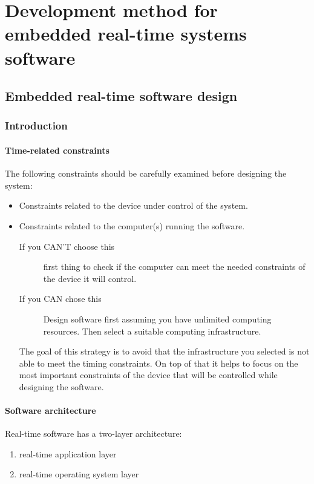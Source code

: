 \documentclass[../main.tex]{subfiles}
\begin{document}
\chapter{Development method for embedded real-time systems software}

\section{Embedded real-time software design}
\subsection{Introduction}

\subsubsection{Time-related constraints}
The following constraints should be carefully examined before designing the system: 
\begin{itemize}
	\item Constraints related to the device under control of the system. 
	\item Constraints related to the computer(s) running the software. 
		\begin{description}
			\item[If you CAN'T choose this] first thing to check if the computer can meet the needed constraints of the device it will control.
				\item[If you CAN  chose this] Design software first assuming you have unlimited computing resources. Then select a suitable computing infrastructure.
		\end{description} 
	The goal of this strategy is to avoid that the infrastructure you selected is not able to meet the timing constraints. On top of that it helps to focus on the most important constraints of the device that will be controlled while designing the software.
\end{itemize}




\subsubsection{Software architecture}
Real-time software has a two-layer architecture: 
\begin{enumerate}
	\item real-time application layer
	\item real-time operating system layer
\end{enumerate}
\end{document}
